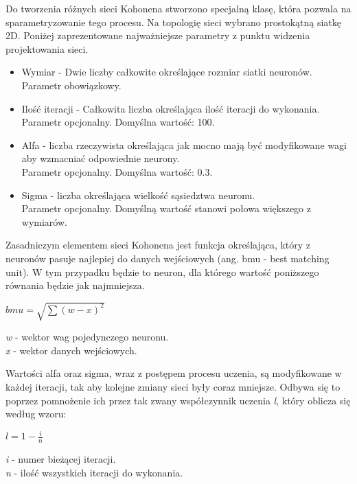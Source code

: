 \documentclass[12pt, notitlepage]{article}
\begin{document}
Do tworzenia różnych sieci Kohonena stworzono specjalną klasę, która pozwala na sparametryzowanie tego procesu. Na topologię sieci wybrano prostokątną siatkę 2D. Poniżej zaprezentowane najważniejsze parametry z punktu widzenia projektowania sieci.
\begin{itemize}
    \item Wymiar - Dwie liczby całkowite określające rozmiar siatki neuronów. 
    \\Parametr obowiązkowy.
    \item Ilość iteracji - Całkowita liczba określająca ilość iteracji do wykonania.
    \\Parametr opcjonalny. Domyślna wartość: 100.
    \item Alfa - liczba rzeczywista określająca jak mocno mają być modyfikowane wagi aby wzmacniać odpowiednie neurony.
    \\Parametr opcjonalny. Domyślna wartość: 0.3.
    \item Sigma - liczba określająca wielkość sąsiedztwa neuronu.
    \\ Parametr opcjonalny. Domyślną wartość stanowi połowa większego z wymiarów.
\end{itemize}

Zasadniczym elementem sieci Kohonena jest funkcja określająca, który z neuronów pasuje najlepiej do danych wejściowych (ang. bmu - best matching unit). W tym przypadku będzie to neuron, dla którego wartość poniższego równania będzie jak najmniejsza.
\begin{center}
    $ bmu = \sqrt{\sum (w - x)^2} $ \\
\end{center}
\textit{w} - wektor wag pojedynczego neuronu. \\
\textit{x} - wektor danych wejściowych.

Wartości alfa oraz sigma, wraz z postępem procesu uczenia, są modyfikowane w każdej iteracji, tak aby kolejne zmiany sieci były coraz mniejsze. Odbywa się to poprzez pomnożenie ich przez tak zwany współczynnik uczenia \textit{l}, który oblicza się według wzoru:
\begin{center}
    $ l = 1 - \frac{i}{n} $ \\
\end{center}
\textit{i} - numer bieżącej iteracji. \\
\textit{n} - ilość wszystkich iteracji do wykonania.
\end{document}
